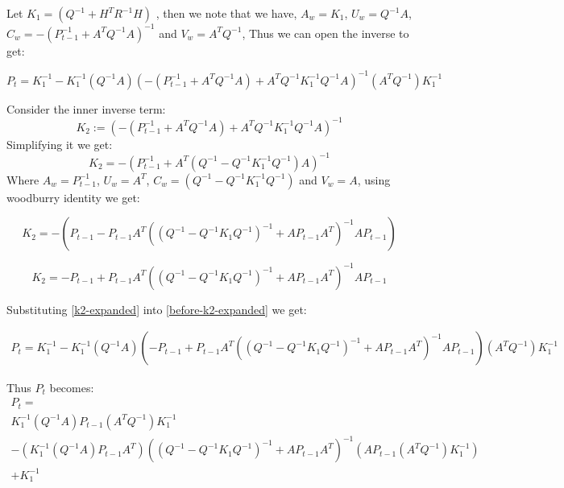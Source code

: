 \documentclass{tufte-handout}
\begin{document}
\begin{enumerate}[(a)]
   Let $K_1 =(Q^{-1}  + H^TR^{-1}H)$ , then we note that we have, 
   $A_w = K_1$, $U_w = Q^{-1}A$, $C_w =-(P_{t-1}^{-1} + A^TQ^{-1}A)^{-1} $ and $V_w = A^TQ^{-1}$, Thus we can open the inverse to get:

  \begin{equation} 
    P_t = K_1^{-1}  - K_1^{-1} (Q^{-1}A) \left( -(P_{t-1}^{-1} + A^TQ^{-1}A) + A^TQ^{-1} K_1^{-1} Q^{-1}A \right)^{-1} (A^T Q^{-1}) K_1^{-1}
    \label{before-k2-expanded}
  \end{equation}

 Consider the inner inverse term:  
 \begin{equation}
     K_2 :=  (-(P_{t-1}^{-1} + A^TQ^{-1}A) + A^TQ^{-1} K_1^{-1} Q^{-1}A)^{-1} 
 \end{equation} 
  Simplifying it we get: 
  \begin{equation}
     K_2 =  -\left(P_{t-1}^{-1} + A^T(  Q^{-1} - Q^{-1} K_1^{-1} Q^{-1})A \right)^{-1} 
  \end{equation}
  Where $A_w = P_{t-1}^{-1}$, $U_w = A^T$, $C_w = (  Q^{-1} - Q^{-1} K_1^{-1} Q^{-1})$  and $V_w = A$, using woodburry identity we get: 

  \begin{equation} 
    K_2 = - \left( P_{t-1}  - P_{t-1}A^{T}( (Q^{-1} - Q^{-1}K_1 Q^{-1})^{-1} + A P_{t-1} A^T)^{-1}A P_{t-1}  \right)
  \end{equation}

  \begin{equation}
     K_2 =  -P_{t-1}  + P_{t-1}A^{T}( (Q^{-1} - Q^{-1}K_1 Q^{-1})^{-1} + A P_{t-1} A^T)^{-1}A P_{t-1}   
     \label{k2-expanded}
  \end{equation}

Substituting \ref{k2-expanded} into \ref{before-k2-expanded}  we get:

\begin{multline}
    P_t = K_1^{-1} - K_1^{-1} (Q^{-1}A) \left(-P_{t-1}  + P_{t-1}A^{T}( (Q^{-1} - Q^{-1}K_1 Q^{-1})^{-1} + A P_{t-1} A^T)^{-1}A P_{t-1}  \right) (A^T Q^{-1}) K_1^{-1}
\end{multline}

Thus $P_t$ becomes:
\begin{multline}
     P_t = \\ 
     K_1^{-1} (Q^{-1}A) P_{t-1} (A^T Q^{-1}) K_1^{-1}\\
   - (K_1^{-1} (Q^{-1}A)  
    P_{t-1}A^{T})( (Q^{-1} - Q^{-1}K_1 Q^{-1})^{-1} + A P_{t-1} A^T)^{-1} (A P_{t-1} (A^T Q^{-1}) K_1^{-1}) \\ 
    + K_1^{-1} 
\end{multline}


\end{enumerate}
\end{document}
